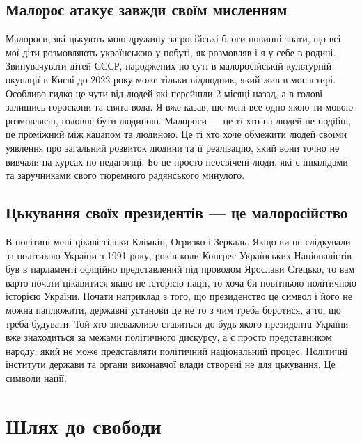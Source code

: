 \subsection{Малорос атакує завжди своїм мисленням}

Малороси, які цькують мою дружину за російські блоги повинні знати,
що всі мої діти розмовляють українською у побуті, як розмовляв і я
у себе в родині. Звинувачувати дітей СССР, народжених по суті в
малоросійській культурній окупації в Києві до 2022 року може тільки
відлюдник, який жив в монастирі. Особливо гидко це чути від людей
які перейшли 2 місяці назад, а в голові залишись гороскопи та свята вода.
Я вже казав, що мені все одно якою ти мовою розмовляєш, головне бути людиною.
Малороси --- це ті хто на людей не подібні, це проміжний між кацапом та людиною.
Це ті хто хоче обмежити людей своїми уявлення про загальний розвиток людини
та її реалізацію, який вони точно не вивчали на курсах по педагогіці. Бо це
просто неосвічені люди, які є інвалідами та заручниками свого тюремного радянського минулого.

\subsection{Цькування своїх президентів --- це малоросійство}

В політиці мені цікаві тільки Клімкін, Огризко і Зеркаль. Якщо
ви не слідкували за політикою України з 1991 року, років коли
Конгрес Українських Націоналістів був в парламенті офіційно представлений
під проводом Ярослави Стецько, то вам варто почати цікавитися якщо не
історією нації, то хоча би новітньою політичною історією України.
Почати наприклад з того, що президенство це символ і його не можна
паплюжити, державні установи це не то з чим треба боротися, а то,
що треба будувати. Той хто зневажливо ставиться до будь якого президента
України вже знаходиться за межами політичного дискурсу, а є просто
представником народу, який не може представляти політичний національний
процес. Політичні інститути держави та органи виконавчої влади створені
не для цькування. Це символи нації.

\section*{Шлях до свободи}

